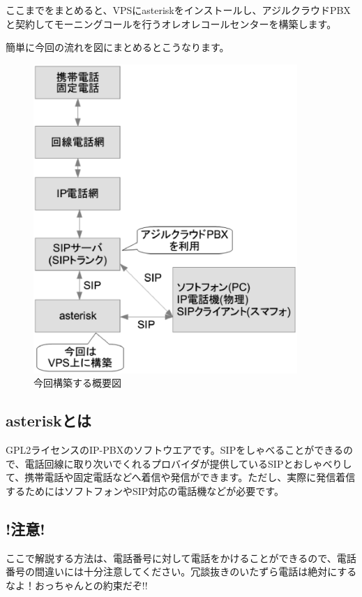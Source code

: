 ここまでをまとめると、VPSにasteriskをインストールし、アジルクラウドPBXと契約してモーニングコールを行うオレオレコールセンターを構築します。

簡単に今回の流れを図にまとめるとこうなります。

\begin{figure}[htbp]
 \begin{center}
  \includegraphics[width=100mm]{tboffice-asterisk/img/gaiyou.eps}
 \end{center}
 \caption{今回構築する概要図}
 \label{fig:gaiyou}
\end{figure}

\subsection{asteriskとは}
GPL2ライセンスのIP-PBXのソフトウエアです。SIPをしゃべることができるので、電話回線に取り次いでくれるプロバイダが提供しているSIPとおしゃべりして、携帯電話や固定電話などへ着信や発信ができます。ただし、実際に発信着信するためにはソフトフォンやSIP対応の電話機などが必要です。

\subsection{!注意!}
ここで解説する方法は、電話番号に対して電話をかけることができるので、電話番号の間違いには十分注意してください。冗談抜きのいたずら電話は絶対にするなよ！おっちゃんとの約束だぞ!!

